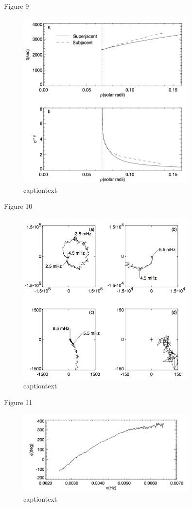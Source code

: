 \documentclass{beamer}
\begin{document}
\begin{frame}{Figure 9}
    \begin{figure}
        \includegraphics[width=0.8\textwidth]{fig_9.png}
        \caption{captiontext}
    \end{figure}
\end{frame}

\begin{frame}{Figure 10}
    \begin{figure}
        \includegraphics[width=0.8\textwidth]{fig_10.png}
        \caption{captiontext}
    \end{figure}
\end{frame}

\begin{frame}{Figure 11}
    \begin{figure}
        \includegraphics[width=0.8\textwidth]{fig_11.png}
        \caption{captiontext}
    \end{figure}
\end{frame}
\end{document}
